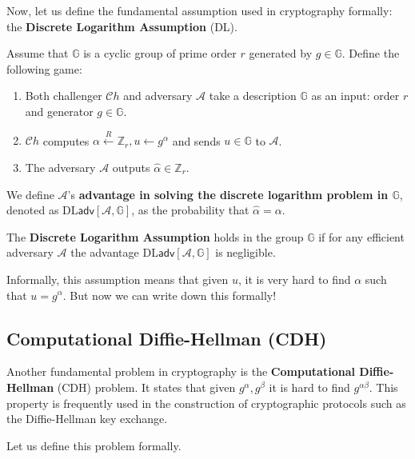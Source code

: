 \documentclass[../lecture-notes.tex]{subfiles}
\begin{document}
Now, let us define the fundamental assumption used in cryptography formally: the \textbf{Discrete Logarithm Assumption} (DL).

\begin{definition}
    Assume that $\mathbb{G}$ is a cyclic group of prime order $r$ generated by $g \in \mathbb{G}$. Define the following game:
    \begin{enumerate}
        \item Both challenger $\mathcal{C}h$ and adversary $\mathcal{A}$ take a description $\mathbb{G}$ as an input: order $r$ and generator $g \in \mathbb{G}$.
        \item $\mathcal{C}h$ computes $\alpha \xleftarrow{R} \mathbb{Z}_r, u \gets g^{\alpha}$ and sends $u \in \mathbb{G}$ to $\mathcal{A}$.
        \item The adversary $\mathcal{A}$ outputs $\hat{\alpha} \in \mathbb{Z}_r$.
    \end{enumerate}

    We define $\mathcal{A}$'s \textbf{advantage in solving the discrete logarithm problem in $\mathbb{G}$}, denoted as $\text{DL}\mathsf{adv}[\mathcal{A},\mathbb{G}]$, as the probability that $\hat{\alpha} = \alpha$.
\end{definition}

\begin{definition}
    The \textbf{Discrete Logarithm Assumption} holds in the group $\mathbb{G}$ if for any efficient adversary $\mathcal{A}$ the advantage $\text{DL}\mathsf{adv}[\mathcal{A},\mathbb{G}]$ is negligible.
\end{definition}

Informally, this assumption means that given $u$, it is very hard to find $\alpha$ such that $u = g^{\alpha}$. But now we can write down this formally!

\subsection{Computational Diffie-Hellman (CDH)}

Another fundamental problem in cryptography is the \textbf{Computational Diffie-Hellman} (CDH) problem. It states that given $g^{\alpha},g^{\beta}$ it is hard to find $g^{\alpha\beta}$. This property is frequently used in the construction of cryptographic protocols such as the Diffie-Hellman key exchange.

Let us define this problem formally.
\end{document}
